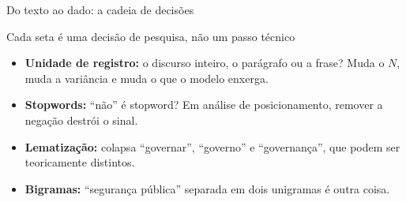 \documentclass[11pt,aspectratio=169]{beamer}
\begin{document}
\begin{frame}{Do texto ao dado: a cadeia de decisões}
\centering
{}
\vspace{0.35cm}

\begin{block}{Cada seta é uma decisão de pesquisa, não um passo técnico}
\small
\begin{itemize}
  \item \textbf{Unidade de registro:} o discurso inteiro, o parágrafo ou a
        frase? Muda o $N$, muda a variância e muda o que o modelo enxerga.
  \item \textbf{Stopwords:} ``não'' é stopword? Em análise de posicionamento,
        remover a negação destrói o sinal.
  \item \textbf{Lematização:} colapsa ``governar'', ``governo'' e ``governança'',
        que podem ser teoricamente distintos.
  \item \textbf{Bigramas:} ``segurança pública'' separada em dois unigramas é
        outra coisa.
\end{itemize}
\end{block}
\end{frame}
\end{document}

